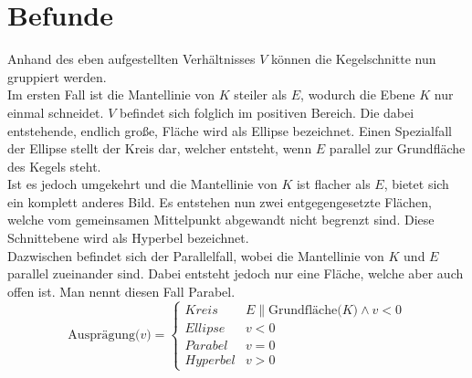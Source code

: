 \section{Befunde}
Anhand des eben aufgestellten Verhältnisses $V$ können die Kegelschnitte nun gruppiert werden.\\
Im ersten Fall ist die Mantellinie von $K$ steiler als $E$, wodurch die Ebene $K$ nur einmal schneidet. $V$ befindet sich folglich im positiven Bereich. Die dabei entstehende, endlich große, Fläche wird als Ellipse bezeichnet. Einen Spezialfall der Ellipse stellt der Kreis dar, welcher entsteht, wenn $E$ parallel zur Grundfläche des Kegels steht.\\
Ist es jedoch umgekehrt und die Mantellinie von $K$ ist flacher als $E$, bietet sich ein komplett anderes Bild. Es entstehen nun zwei entgegengesetzte Flächen, welche vom gemeinsamen Mittelpunkt abgewandt nicht begrenzt sind. Diese Schnittebene wird als Hyperbel bezeichnet.\\
Dazwischen befindet sich der Parallelfall, wobei die Mantellinie von $K$ und $E$ parallel zueinander sind. Dabei entsteht jedoch nur eine Fläche, welche aber auch offen ist. Man nennt diesen Fall Parabel.\\
\begin{displaymath}
   \text{Ausprägung($v$)} = \left\{
     \begin{array}{lr}
       Kreis & E \parallel \text{Grundfläche($K$)} \wedge v < 0 \\
       Ellipse & v < 0\\
       Parabel & v = 0\\
       Hyperbel & v > 0
     \end{array}
   \right.
\end{displaymath}